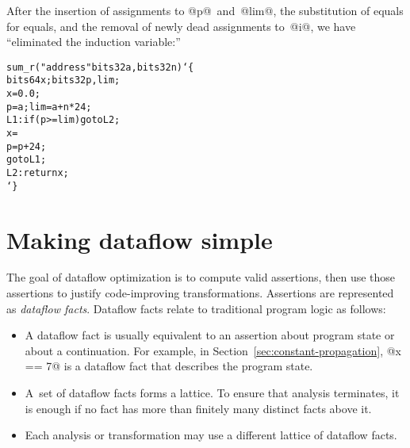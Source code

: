 \documentclass[blockstyle,preprint,natbib,nocopyrightspace]{sigplanconf}
\newcommand\lbr{\char`\{}
\newcommand\rbr{\char`\}}
\newcommand\secref[1]{Section~\ref{sec:#1}}
\newcommand\seclabel[1]{\label{sec:#1}}
\begin{document}
After the insertion of assignments to @p@~and~@lim@, the substitution
of equals for equals, and the removal of newly dead assignments
to~@i@, we have ``eliminated the induction variable:''
\begin{alltt}
sum_r("address" bits32 a, bits32 n) \lbr
     bits64 x; bits32 p, lim;
     x = 0.0;
     p = a; lim = a + n * 24;
 L1: if ({p >= lim}) goto L2;
     x = %fadd(x, bits64[{p}]);
     p = p + 24;
     goto L1;
 L2: return x; 
\rbr
\end{alltt}

  
\section {Making dataflow simple}

\seclabel{making-simple}

\seclabel{create-analysis}

The goal of dataflow optimization is to compute valid
assertions, then use those assertions to justify code-improving
transformations.
%
%
Assertions are represented as
\emph{dataflow facts}.
Dataflow facts relate to
 traditional 
program logic as follows:
\begin{itemize}
\item
A dataflow fact is usually equivalent to an assertion about program state or
about a continuation.
For example, in \secref{constant-propagation}, @x == 7@ is a dataflow
fact that describes the program state. 


\item
A~set of dataflow facts forms a lattice.
To ensure that analysis terminates,
it is enough if
no fact has more than finitely many distinct facts above it.
\item
Each analysis or transformation may use a different lattice of
dataflow facts.
\end{itemize}
\end{document}
